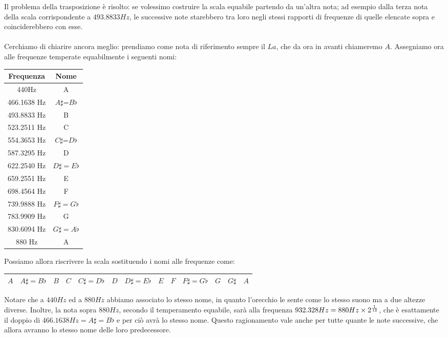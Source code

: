 \documentclass[12pt,a4paper]{report}
\theoremstyle{definition}
\theoremstyle{Theorem}
\theoremstyle{definition}
\theoremstyle{definition}
\theoremstyle{definition}
\begin{document}
	 Il problema della trasposizione è risolto: se volessimo costruire la scala equabile partendo da un'altra nota; ad esempio dalla terza nota della scala corrispondente a $493.8833 Hz$, le successive note starebbero tra loro negli stessi rapporti di frequenze di quelle elencate sopra e coinciderebbero con esse.\\
	 \\
	 Cerchiamo di chiarire ancora meglio: prendiamo come nota di riferimento sempre il $La$, che da ora in avanti chiameremo $A$. Assegniamo ora alle frequenze temperate equabilmente i seguenti nomi:
	 \begin{center}
	 	\begin{tabular}{||c|c||}
	 		\hline 
	 		Frequenza & Nome\\
	 		\hline
	 		440Hz&A\\
	 		\hline 
	 		466.1638 Hz&$A\sharp$=$B\flat$\\
	 		\hline 
	 		493.8833 Hz&B\\
	 		\hline
	 		523.2511 Hz&C\\
	 		\hline
	 		554.3653 Hz&$C\sharp$=$D\flat$\\
	 		\hline 
	 		587.3295 Hz&D\\
	 		\hline
	 		622.2540 Hz&$D\sharp=E\flat$\\
	 		\hline
	 		659.2551 Hz&E\\
	 		\hline
	 		698.4564 Hz&F\\
	 		\hline
	 		739.9888 Hz&$F\sharp=G\flat$\\
	 		\hline
	 		783.9909 Hz&G\\
	 		\hline 
	 		830.6094 Hz&$G\sharp=A\flat$\\
	 		\hline 880 Hz &A\\
	 		\hline
	 	\end{tabular}
	 \end{center}
	 Possiamo allora riscrivere la scala sostituendo i nomi alle frequenze come:
	 \begin{center}
	 	\begin{tabular}{|c|c|c|c|c|c|c|c|c|c|c|c|c|}
	 		\hline
	 		$A$&$A\sharp=B\flat$&$B$&$C$&$C\sharp=D\flat$&$D$&$D\sharp=E\flat$&$E$&$F$&$F\sharp=G\flat$&$G$&$G\sharp$&$A$ \\
	 		\hline
	 	\end{tabular}
	 \end{center}
	 Notare che a $440Hz$ ed a $880Hz$ abbiamo associato lo stesso nome, in quanto l'orecchio le sente come lo stesso suono ma a due altezze diverse. Inoltre, la nota sopra $880Hz$, secondo il temperamento equabile, sarà alla frequenza $932.328 Hz=880 Hz\times 2^{1\over 12}$, che è esattamente il doppio di $466.1638 Hz=A\sharp=B\flat$ e per ciò avrà lo stesso nome. Questo ragionamento vale anche per tutte quante le note successive, che allora avranno lo stesso nome delle loro predecessore.\\
\end{document}

